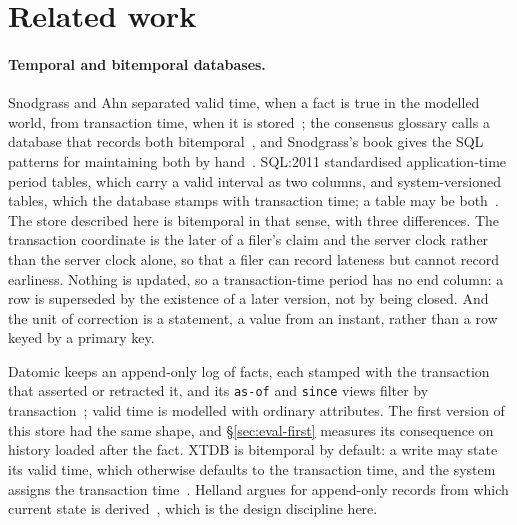 \section{Related work}
\label{sec:related}

\paragraph{Temporal and bitemporal databases.}
Snodgrass and Ahn separated valid time, when a fact is true in the modelled
world, from transaction time, when it is stored~\cite{snodgrass1985taxonomy}; the
consensus glossary calls a database that records both
bitemporal~\cite{jensen1998glossary}, and Snodgrass's book gives the SQL
patterns for maintaining both by hand~\cite{snodgrass2000developing}.
SQL:2011 standardised application-time period tables, which carry a valid
interval as two columns, and system-versioned tables, which the database stamps
with transaction time; a table may be both~\cite{kulkarni2012sql2011}. The store
described here is bitemporal in that sense, with three differences. The
transaction coordinate is the later of a filer's claim and the server clock
rather than the server clock alone, so that a filer can record lateness but
cannot record earliness. Nothing is updated, so a transaction-time period has no
end column: a row is superseded by the existence of a later version, not by
being closed. And the unit of correction is a statement, a value from an
instant, rather than a row keyed by a primary key.

Datomic keeps an append-only log of facts, each stamped with the transaction
that asserted or retracted it, and its \texttt{as-of} and \texttt{since} views
filter by transaction~\cite{datomic}; valid time is modelled with ordinary
attributes. The first version of this store had the same shape, and
\S\ref{sec:eval-first} measures its consequence on history loaded after the
fact. XTDB is bitemporal by default: a write may state its valid time, which
otherwise defaults to the transaction time, and the system assigns the
transaction time~\cite{xtdb}. Helland argues for
append-only records from which current state is derived~\cite{helland2015immutability},
which is the design discipline here.

